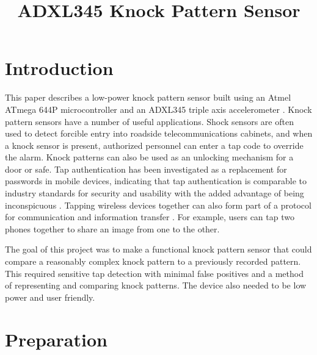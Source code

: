 \documentclass[conference]{./IEEEtran}
\begin{document}
%
\title{ADXL345 Knock Pattern Sensor}


\author{
}

\maketitle


\section{Introduction}
This paper describes a low-power knock pattern sensor built using an Atmel ATmega 644P microcontroller \cite{atmega644p} and an ADXL345 triple axis accelerometer \cite{devices2011adxl345}. Knock pattern sensors have a number of useful applications. Shock sensors are often used to detect forcible entry into roadside telecommunications cabinets, and when a knock sensor is present, authorized personnel can enter a tap code to override the alarm. Knock patterns can also be used as an unlocking mechanism for a door or safe. Tap authentication has been investigated as a replacement for passwords in mobile devices, indicating that tap authentication is comparable to industry standards for security and usability with the added advantage of being inconspicuous \cite{marques}. Tapping wireless devices together can also form part of a protocol for communication and information transfer \cite{thorn}. For example, users can tap two phones together to share an image from one to the other.

The goal of this project was to make a functional knock pattern sensor that could compare a reasonably complex knock pattern to a previously recorded pattern. This required sensitive tap detection with minimal false positives and a method of representing and comparing knock patterns. The device also needed to be low power and user friendly. 

\section{Preparation}
\end{document}
